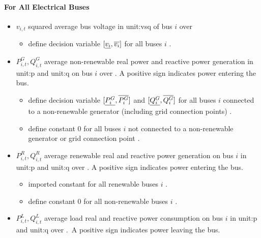 \paragraph{For All Electrical Buses}
\begin{itemize}

\item $v_{i,t}$ squared average bus voltage in \gls{unit:vsq} of bus $i$
over \intervaloft{}

\begin{itemize} \item \gls{define} decision variable
      $[\underline{v_i}, \overline{v_i}]$ for all buses $i$ \atallt{}. \end{itemize}

\item $P^G_{i,t}, Q^G_{i,t}$ average non-renewable real power and reactive power
  generation in \gls{unit:p} and \gls{unit:q} on bus $i$ over \intervaloft{}.  A
  positive sign indicates power entering the bus.

\begin{itemize} \item \gls{define}
  decision variable $[\underline{P^G_i}, \overline{P^G_i}]$ and $[\underline{Q^G_i}, \overline{Q^G_i}]$
  for all buses $i$ connected to a non-renewable generator (including grid
  connection points) \atallt{}.

\item
\gls{define} constant 0 for all buses $i$ not connected to a non-renewable
generator or grid connection point \atallt{}.
\end{itemize}

\item $P^R_{i,t}, Q^R_{i,t}$ average renewable real and reactive power
  generation on bus $i$ in \gls{unit:p} and \gls{unit:q} over \intervaloft{}. A
  positive sign indicates power entering the bus.

\begin{itemize}

\item \gls{imported} constant for all renewable buses $i$ \atallt{}.

\item \gls{define}  constant 0 for all non-renewable buses $i$ \atallt{}.

\end{itemize}

\item $P^L_{i,t}, Q^L_{i,t}$ average load real and reactive power consumption on
  bus $i$ in \gls{unit:p} and \gls{unit:q} over \intervaloft{}.\ A positive sign
  indicates power leaving the bus.


\end{itemize}
